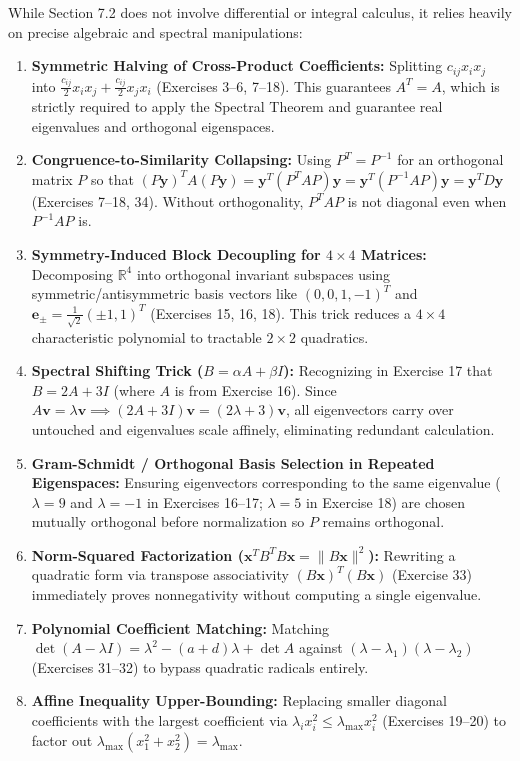 \documentclass[11pt, letterpaper]{article}
\theoremstyle{definition}
\theoremstyle{remark}
\begin{document}
While Section 7.2 does not involve differential or integral calculus, it relies heavily on precise algebraic and spectral manipulations:
\begin{enumerate}
    \item \textbf{Symmetric Halving of Cross-Product Coefficients:} Splitting $c_{ij} x_i x_j$ into $\frac{c_{ij}}{2} x_i x_j + \frac{c_{ij}}{2} x_j x_i$ (Exercises 3--6, 7--18). This guarantees $A^T = A$, which is strictly required to apply the Spectral Theorem and guarantee real eigenvalues and orthogonal eigenspaces.
    \item \textbf{Congruence-to-Similarity Collapsing:} Using $P^T = P^{-1}$ for an orthogonal matrix $P$ so that $(P\mathbf{y})^T A (P\mathbf{y}) = \mathbf{y}^T (P^T A P) \mathbf{y} = \mathbf{y}^T (P^{-1} A P) \mathbf{y} = \mathbf{y}^T D \mathbf{y}$ (Exercises 7--18, 34). Without orthogonality, $P^T A P$ is not diagonal even when $P^{-1} A P$ is.
    \item \textbf{Symmetry-Induced Block Decoupling for $4 \times 4$ Matrices:} Decomposing $\mathbb{R}^4$ into orthogonal invariant subspaces using symmetric/antisymmetric basis vectors like $(0,0,1,-1)^T$ and $\mathbf{e}_{\pm} = \frac{1}{\sqrt{2}}(\pm 1, 1)^T$ (Exercises 15, 16, 18). This trick reduces a $4 \times 4$ characteristic polynomial to tractable $2 \times 2$ quadratics.
    \item \textbf{Spectral Shifting Trick ($B = \alpha A + \beta I$):} Recognizing in Exercise 17 that $B = 2A + 3I$ (where $A$ is from Exercise 16). Since $A\mathbf{v} = \lambda \mathbf{v} \implies (2A + 3I)\mathbf{v} = (2\lambda + 3)\mathbf{v}$, all eigenvectors carry over untouched and eigenvalues scale affinely, eliminating redundant calculation.
    \item \textbf{Gram-Schmidt / Orthogonal Basis Selection in Repeated Eigenspaces:} Ensuring eigenvectors corresponding to the same eigenvalue ($\lambda = 9$ and $\lambda = -1$ in Exercises 16--17; $\lambda = 5$ in Exercise 18) are chosen mutually orthogonal before normalization so $P$ remains orthogonal.
    \item \textbf{Norm-Squared Factorization ($\mathbf{x}^T B^T B \mathbf{x} = \|B\mathbf{x}\|^2$):} Rewriting a quadratic form via transpose associativity $(B\mathbf{x})^T (B\mathbf{x})$ (Exercise 33) immediately proves nonnegativity without computing a single eigenvalue.
    \item \textbf{Polynomial Coefficient Matching:} Matching $\det(A - \lambda I) = \lambda^2 - (a+d)\lambda + \det A$ against $(\lambda - \lambda_1)(\lambda - \lambda_2)$ (Exercises 31--32) to bypass quadratic radicals entirely.
    \item \textbf{Affine Inequality Upper-Bounding:} Replacing smaller diagonal coefficients with the largest coefficient via $\lambda_i x_i^2 \le \lambda_{\max} x_i^2$ (Exercises 19--20) to factor out $\lambda_{\max}(x_1^2 + x_2^2) = \lambda_{\max}$.
\end{enumerate}
\end{document}
